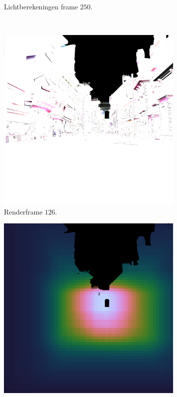\begin{figure}[t]
\begin{subfigure}[b]{0.35\textwidth}
    \caption{Lichtberekeningen frame $250$.}
    \vspace{2pt}
    \label{fig:ts-test-frames-example:sa:250lc}
  \end{subfigure}\\
  \begin{subfigure}[b]{0.35\textwidth}
    \includegraphics[width=\textwidth]{./img/raw/lc-frame-example/render/pa_frame_126.png}
    \caption{Renderframe $126$.}
    \vspace{2pt}
    \label{fig:ts-test-frames-example:pa:126render}
  \end{subfigure}\quad %
  \begin{subfigure}[b]{0.35\textwidth}
    \includegraphics[width=\textwidth]{./img/raw/lc-frame-example/ts/pa_frame_126.png}

\end{subfigure}
\end{figure}
